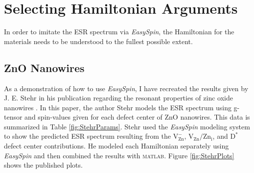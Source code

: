 \documentclass[oneside]{BYUPhys}
\begin{document}
\section{Selecting Hamiltonian Arguments}

In order to imitate the ESR spectrum via \textit{EasySpin}, the Hamiltonian for the materials needs to be understood to the fullest possible extent.

\subsection{ZnO Nanowires}
 
As a demonstration of how to use \textit{EasySpin}, I have recreated the results given by J. E. Stehr in his publication regarding the resonant properties of zinc oxide nanowires \cite{RefWorks:doc:58929128e4b0228a292928a7}. In this paper, the author Stehr models the ESR spectrum using g-tensor and spin-values given for each defect center of ZnO nanowires. This data is summarized in Table \ref{fig:StehrParams}. Stehr used the \textit{EasySpin} modeling system to show the predicted ESR spectrum resulting from the $\text{V}_{\text{Zn}}^{-}$, $\text{V}_{\text{Zn}}/\text{Zn}_{\text{i}}$, and $\text{D}^{*}$ defect center contributions. He modeled each Hamiltonian separately using \textit{EasySpin} and then combined the results with \textsc{matlab}. Figure \ref{fig:StehrPlots} shows the published plots.
\end{document}
